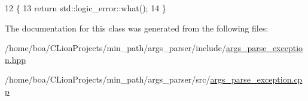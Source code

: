 \begin{DoxyCode}
12                                                            \{
13             \textcolor{keywordflow}{return} std::logic\_error::what();
14         \}
\end{DoxyCode}


The documentation for this class was generated from the following files\+:\begin{DoxyCompactItemize}
\item 
/home/boa/\+C\+Lion\+Projects/min\+\_\+path/args\+\_\+parser/include/\hyperlink{a00010}{args\+\_\+parse\+\_\+exception.\+hpp}\item 
/home/boa/\+C\+Lion\+Projects/min\+\_\+path/args\+\_\+parser/src/\hyperlink{a00012}{args\+\_\+parse\+\_\+exception.\+cpp}\end{DoxyCompactItemize}
